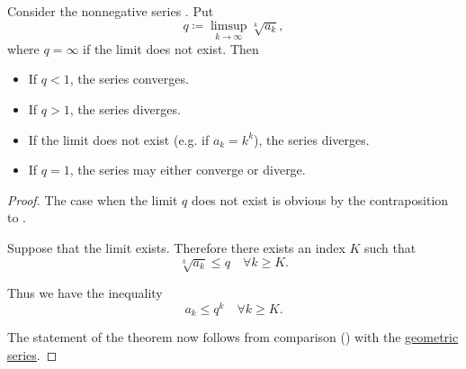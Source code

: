 \begin{proposition}\label{thm:cauchys_root_test}
  Consider the nonnegative series . Put
  \begin{equation*}
    q \coloneqq \limsup_{k \to \infty} \sqrt[k]{a_k},
  \end{equation*}
  where \( q = \infty \) if the limit does not exist. Then
  \begin{itemize}
    \item If \( q < 1 \), the series converges.
    \item If \( q > 1 \), the series diverges.
    \item If the limit does not exist (e.g. if \( a_k = k^k \)), the series diverges.
    \item If \( q = 1 \), the series may either converge or diverge.
  \end{itemize}
\end{proposition}
\begin{proof}
  The case when the limit \( q \) does not exist is obvious by the contraposition to .

  Suppose that the limit exists. Therefore there exists an index \( K \) such that
  \begin{equation*}
    \sqrt[k]{a_k} \leq q \quad\forall k \geq K.
  \end{equation*}

  Thus we have the inequality
  \begin{equation*}
    a_k \leq q^k \quad\forall k \geq K.
  \end{equation*}

  The statement of the theorem now follows from comparison () with the \hyperref[def:geometric_progression/series]{geometric series}.
\end{proof}

